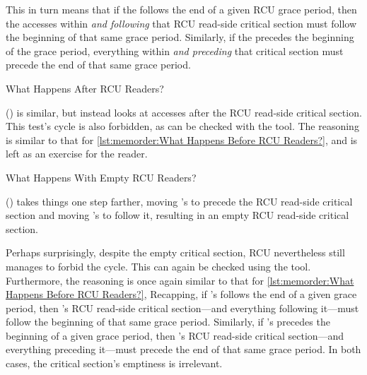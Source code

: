 This in turn means that if the  follows the end of a
given RCU grace period, then the accesses within \emph{and following}
that RCU read-side critical section must follow the beginning of that
same grace period.
Similarly, if the  precedes the beginning of the grace
period, everything within \emph{and preceding} that critical section
must precede the end of that same grace period.

\begin{listing}

\caption{What Happens After RCU Readers?}
\label{lst:memorder:What Happens After RCU Readers?}
\end{listing}

()
is similar, but instead looks at accesses after the RCU read-side
critical section.
This test's cycle is also forbidden, as can be checked with the 
tool.
The reasoning is similar to that for
\cref{lst:memorder:What Happens Before RCU Readers?},
and is left as an exercise for the reader.

\begin{listing}

\caption{What Happens With Empty RCU Readers?}
\label{lst:memorder:What Happens With Empty RCU Readers?}
\end{listing}

()
takes things one step farther, moving 's 
to precede the RCU read-side critical section and moving
's  to follow it, resulting in an
empty RCU read-side critical section.

Perhaps surprisingly, despite the empty critical section, RCU nevertheless
still manages to forbid the cycle.
This can again be checked using the  tool.
Furthermore, the reasoning is once again similar to that for
\cref{lst:memorder:What Happens Before RCU Readers?},
Recapping, if 's  follows the end of a given
grace period, then 's RCU read-side critical section---and
everything following it---must follow the beginning of that same grace
period.
Similarly, if 's  precedes the beginning of a
given grace period, then 's RCU read-side critical section---and
everything preceding it---must precede the end of that same grace period.
In both cases, the critical section's emptiness is irrelevant.

